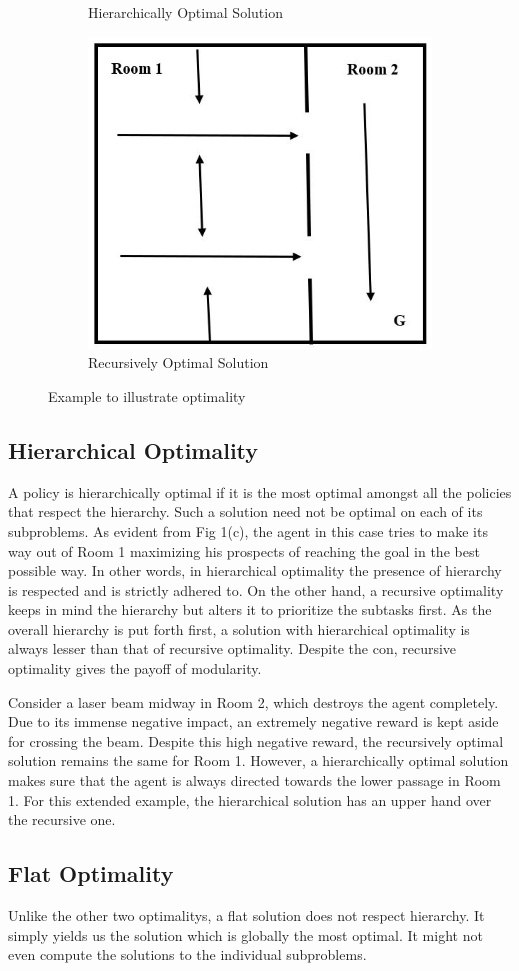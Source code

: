 \begin{figure}[ht]
\begin{subfigure}[b]{0.5\linewidth}
    \caption{Hierarchically Optimal Solution} 
    \vspace{4ex}
  \end{subfigure}%
  \begin{subfigure}[b]{0.5\linewidth}
    \centering
    \includegraphics[width=.5\linewidth]{images/img4.JPG} 
    \caption{Recursively Optimal Solution} 
    \vspace{4ex}
  \end{subfigure} 
    \caption{Example to illustrate optimality}

\end{figure}

\subsection*{Hierarchical Optimality}

A policy is hierarchically optimal if it is the most optimal amongst all the policies that respect the hierarchy. Such a solution need not be optimal on each of its subproblems. As evident from Fig 1(c), the agent in this case tries to make its way out of Room 1 maximizing his prospects of reaching the goal in the best possible way. In other words, in hierarchical optimality the presence of hierarchy is respected and is strictly adhered to. On the other hand, a recursive optimality keeps in mind the hierarchy but alters it to prioritize the subtasks first. As the overall hierarchy is put forth first, a solution with hierarchical optimality is always lesser than that of recursive optimality. Despite the con, recursive optimality gives the payoff of modularity. 

Consider a laser beam midway in Room 2, which destroys the agent completely. Due to its immense negative impact, an extremely negative reward is kept aside for crossing the beam. Despite this high negative reward, the recursively optimal solution remains the same for Room 1. However, a hierarchically optimal solution makes sure that the agent is always directed towards the lower passage in Room 1. For this extended example, the hierarchical solution has an upper hand over the recursive one. 


\subsection*{Flat Optimality}

Unlike the other two optimalitys, a flat solution does not respect hierarchy. It simply yields us the solution which is globally the most optimal. It might not even compute the solutions to the individual subproblems. 
